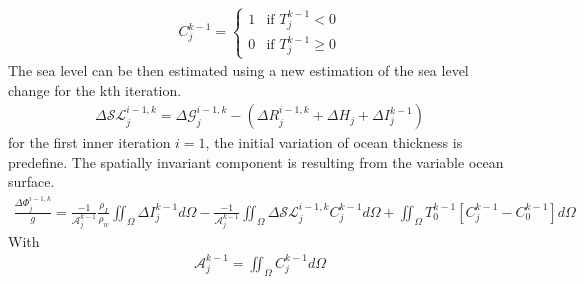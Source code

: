 \documentclass[letterpaper,10pt,english]{sphinxmanual}
\begin{document}
\label{\detokenize{numerical_imp:oc-func}}\begin{equation*}
\begin{split}C_j^{k-1} =
\begin{cases}
    1 & \text{if } T_j^{k-1} <0 \\
    0 & \text{if } T_j^{k-1} \geq 0
\end{cases}\end{split}
\end{equation*}
\sphinxAtStartPar
The sea level can be then estimated using a new estimation of the sea level change for the kth iteration.
\begin{equation*}
\begin{split}\Delta \mathcal{SL}^{i-1,k}_j = \Delta \mathcal{G}^{i-1,k}_j - (\Delta R^{i-1,k}_j+\Delta H_j + \Delta I_j^{k-1})\end{split}
\end{equation*}
\sphinxAtStartPar
for the first inner iteration \(i=1\), the initial variation of ocean thickness is predefine. The spatially invariant component is resulting from the variable ocean surface.
\begin{equation*}
\begin{split}\frac{\Delta \Phi ^{i-1,k}_j}{g} = \frac{-1}{\mathcal{A}^{k-1}_j} \frac{\rho_I}{\rho_w}\iint_\Omega\Delta I_j^{k-1} d\Omega - \frac{-1}{\mathcal{A}^{k-1}_j} \iint_\Omega \Delta \mathcal{SL}_j^{i-1,k} C_j^{k-1} d\Omega + \iint_\Omega T_0^{k-1}[C_j^{k-1} - C_0^{k-1}] d\Omega\end{split}
\end{equation*}
\sphinxAtStartPar
With
\begin{equation*}
\begin{split}\mathcal{A}^{k-1}_j=\iint_\Omega C_j^{k-1} d\Omega\end{split}
\end{equation*}
\end{document}
